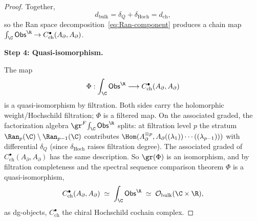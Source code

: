 \begin{proof}
Together,
\begin{equation}
d_{\mathrm{bulk}} = \delta_Q + \delta_{\mathrm{Hoch}} = d_{\mathrm{ch}},
\end{equation}
so the Ran space decomposition~\eqref{eq:Ran-component} produces a chain map $\int_{\C} \mathsf{Obs}^{\R} \to C^\bullet_{\mathrm{ch}}(A_{\partial}, A_{\partial})$.

\medskip
\textbf{Step 4: Quasi-isomorphism.}

The map
\begin{equation}
\Phi : \int_{\C} \mathsf{Obs}^{\R} \longrightarrow C^\bullet_{\mathrm{ch}}(A_{\partial}, A_{\partial})
\end{equation}
is a quasi-isomorphism by filtration. Both sides carry the holomorphic weight/Hochschild filtration; $\Phi$ is a filtered map. On the associated graded, the factorization algebra $\gr^F\!\int_{\C} \mathsf{Obs}^{\R}$ splits: at filtration level $p$ the stratum $\Ran_p(\C) \setminus \Ran_{p-1}(\C)$ contributes $\Hom(A_{\partial}^{\otimes p}, A_{\partial}((\lambda_1))\cdots((\lambda_{p-1})))$ with differential $\delta_Q$ (since $\delta_{\mathrm{Hoch}}$ raises filtration degree). The associated graded of $C^\bullet_{\mathrm{ch}}(A_{\partial}, A_{\partial})$ has the same description. So $\gr(\Phi)$ is an isomorphism, and by filtration completeness and the spectral sequence comparison theorem $\Phi$ is a quasi-isomorphism,
\begin{equation}
C^\bullet_{\mathrm{ch}}(A_{\partial}, A_{\partial}) \;\simeq\; \int_{\C} \mathsf{Obs}^{\R} \;\simeq\; \mathcal{O}_{\mathrm{bulk}}(\C \times \R),
\end{equation}
as dg-objects, $C^\bullet_{\mathrm{ch}}$ the chiral Hochschild cochain complex.
\end{proof}


